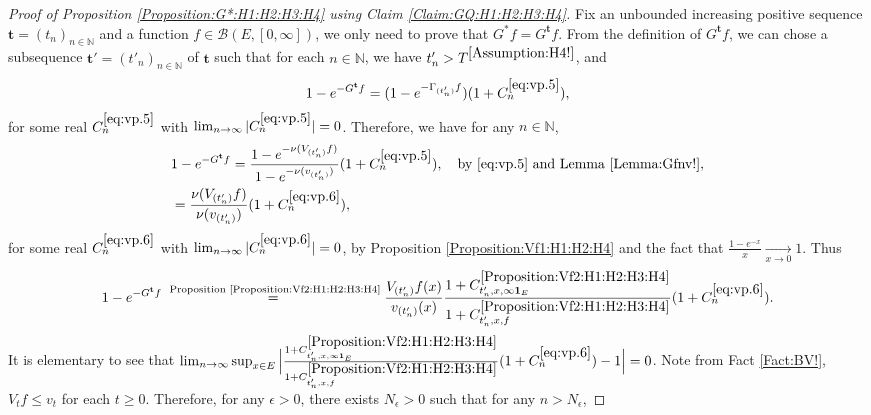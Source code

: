 \documentclass[12pt,a4paper]{amsart}
\numberwithin{equation}{section}
\theoremstyle{plain}
\theoremstyle{definition}
\theoremstyle{remark}
\newcounter{N}
\newcounter{n}[N]
\begin{document}
\begin{proof}[Proof of Proposition \ref{Proposition:G*:H1:H2:H3:H4} using Claim \ref{Claim:GQ:H1:H2:H3:H4}]
Fix an unbounded increasing positive sequence $\mathbf t=(t_n)_{n\in \mathbb N}$ and a function $f\in \mathcal B(E,[0,\infty])$, we only need to 
prove that $G^* f = G^{\mathbf t}f.$
From the definition of $G^{\mathbf t} f$, we can chose a subsequence $\mathbf t'=(t'_n)_{n \in \mathbb N}$ of $\mathbf t$ such that for each $n\in \mathbb N$, we have $t'_n > T^{\ref{Assumption:H4!}}$, and
\begin{align}
\label{eq:vp.5}
1 - e^{- G^{\mathbf t}f} =  ( 1 - e^{-\Gamma_{( t_n')} f} ) (1+C^{\eqref{eq:vp.5}}_n),
\end{align}
for some real $C^{\eqref{eq:vp.5}}_n$ with $\lim_{n\to \infty} |C^{\eqref{eq:vp.5}}_n| =0$.
Therefore, we have for any $n \in \mathbb N$,
\begin{align}
   & 1 - e^{- G^{\mathbf t}f}
   = \frac{1 - e^{- \nu( V_{(t_n')}f)}}{1- e^{- \nu(v_{(t_n')})}}  (1+C^{\eqref{eq:vp.5}}_n),\quad\text{by \eqref{eq:vp.5} and Lemma \ref{Lemma:Gfnv!}},
 \\& \label{eq:vp.6}= \frac{\nu (V_{(t_n')} f)}{\nu(v_{(t_n')})}  (1+C^{\eqref{eq:vp.6}}_n),
\end{align}
for some real $C^{\eqref{eq:vp.6}}_n$ with $\lim_{n\to \infty} |C^{\eqref{eq:vp.6}}_n| =0$, 
by Proposition \ref{Proposition:Vf1:H1:H2:H4} and the fact that $\frac{1- e^{-x}}{x} \xrightarrow[x\to 0]{}1$. Thus
\begin{align}
1 - e^{- G^{\mathbf t}f}
  \overset{\text{ Proposition \ref{Proposition:Vf2:H1:H2:H3:H4}}}=  \frac{V_{(t_n')}f(x)}{v_{(t_n')}(x)} \frac{1+C^{\ref{Proposition:Vf2:H1:H2:H3:H4}}_{t_n',x,\infty \mathbf 1_E}}{1+C^{\ref{Proposition:Vf2:H1:H2:H3:H4}}_{t_n',x,f}} (1+C^{\eqref{eq:vp.6}}_n).
 \end{align}
 It is elementary to see that $\lim_{n\to \infty} \sup_{x\in E} \Big|\frac{1+C^{\ref{Proposition:Vf2:H1:H2:H3:H4}}_{t_n',x,\infty \mathbf 1_E}}{1+C^{\ref{Proposition:Vf2:H1:H2:H3:H4}}_{t_n',x,f}} (1+C^{\eqref{eq:vp.6}}_n) -1 \Big| = 0$.
Note from Fact \ref{Fact:BV!}, $V_tf \leq v_t$ for each $t\geq 0$.
Therefore, for any $\epsilon>0$, there exists $N_\epsilon>0$ such that for any $n>N_\epsilon$,

\end{proof}
\end{document}
